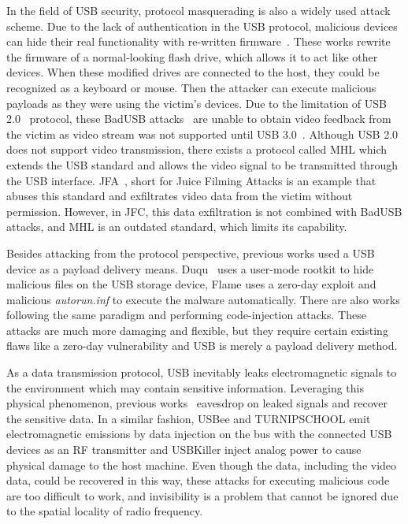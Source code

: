 In the field of \ac{USB} security, protocol masquerading is also a widely used
attack scheme. Due to the lack of authentication in the \ac{USB} protocol, malicious
devices can hide their real functionality with re-written
firmware~\cite{rubber,badusb,rubberducky2020,usbbypassing,iseeyou,usbdriver}.
These works rewrite the firmware of a normal-looking flash drive, which allows
it to act like other devices. When these modified drives are connected to the
host, they could be recognized as a keyboard or mouse. Then the attacker can
execute malicious payloads as they were using the victim's devices. Due to the
limitation of \ac{USB} 2.0~\cite{usb20} protocol, these BadUSB
attacks~\cite{badusb} are unable to obtain video feedback from the victim
as video stream was not supported until \ac{USB} 3.0~\cite{usb30}. Although \ac{USB} 2.0 does not
support video transmission, there exists a protocol called \ac{MHL} which extends the \ac{USB} standard and allows the video signal to
be transmitted through the \ac{USB} interface. JFA~\cite{JFC}, short for Juice Filming Attacks is an example that abuses this standard and exfiltrates video data
from the victim without permission. However, in JFC, this data exfiltration is not
combined with BadUSB attacks, and \ac{MHL} is an outdated standard, which limits its
capability.

Besides attacking from the protocol perspective, previous works used a
\ac{USB} device as a payload delivery means. Duqu~\cite{duqu} uses a user-mode
rootkit to hide malicious files on the \ac{USB} storage device, Flame\cite{flame} uses a
zero-day exploit and malicious \textit{autorun.inf} to execute the malware
automatically. There are also works \cite{brain,stuxnet,conficker}
following the same paradigm and performing code-injection attacks. These
attacks are much more damaging and flexible,
but they require certain existing flaws like a zero-day vulnerability\cite{zero-day}  and \ac{USB} is merely
a payload delivery method.

As a data transmission protocol, \ac{USB} inevitably leaks electromagnetic signals
to the environment which may contain sensitive information. Leveraging this
physical phenomenon, previous works~\cite{smartphone,
poweremi,revealing,su2017usb,usbgpslocator,bates2014leveraging,badusbhub,usbfinger,side,usbdriver}
eavesdrop on leaked signals and recover the sensitive data. In a similar fashion, USBee\cite{usbee} and TURNIPSCHOOL\cite{turnip} emit electromagnetic emissions by data injection on the bus
with the connected \ac{USB} devices as an RF transmitter and USBKiller\cite{usbkiller}
inject analog
power to cause physical damage to the host machine. Even though the data,
including the video data, could be recovered in this way, these attacks for
executing malicious code are too difficult to work, and invisibility is a
problem that cannot be ignored due to the spatial locality of radio frequency.

